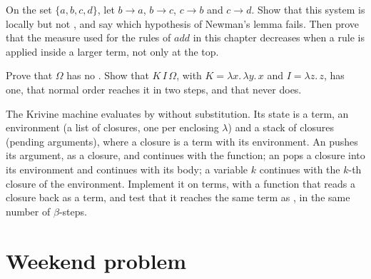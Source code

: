 \begin{exercise}[$\star\star\star$]\label{exo:b3:lambda-calculus:10}
On the set $\{a, b, c, d\}$, let $b \to a$, $b \to c$, $c \to b$ and $c \to d$. Show that this system is locally  but not , and say which hypothesis of Newman's lemma fails. Then prove that the measure used for the rules of $\mathit{add}$ in this chapter decreases when a rule is applied inside a larger term, not only at the top.
\end{exercise}

\begin{exercise}[$\star\star\star$]\label{exo:b3:lambda-calculus:11}
Prove that $\Omega$ has no . Show that $K\,I\,\Omega$, with $K = \lambda x.\,\lambda y.\,x$ and $I = \lambda z.\,z$, has one, that normal order reaches it in two steps, and that  never does.
\end{exercise}

\begin{exercise}[$\star\star\star$]\label{exo:b3:lambda-calculus:12}
The Krivine machine evaluates by  without substitution. Its state is a term, an environment (a list of closures, one per enclosing $\lambda$) and a stack of closures (pending arguments), where a closure is a term with its environment. An  pushes its argument, as a closure, and continues with the function; an  pops a closure into its environment and continues with its body; a variable $k$ continues with the $k$-th closure of the environment. Implement it on  terms, with a function that reads a closure back as a term, and test that it reaches the same term as , in the same number of $\beta$-steps.
\end{exercise}

\section{Weekend problem}\label{sec:b3:lambda-calculus:problem}

